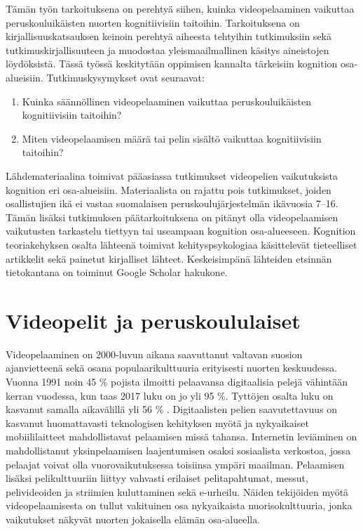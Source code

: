 \documentclass[utf8,bachelor]{gradu3}
\begin{document}
Tämän työn tarkoituksena on perehtyä siihen, kuinka videopelaaminen vaikuttaa peruskouluikäisten nuorten kognitiivisiin taitoihin. Tarkoituksena on kirjallisuuskatsauksen keinoin perehtyä aiheesta tehtyihin tutkimuksiin sekä tutkimuskirjallisuuteen ja muodostaa yleismaailmallinen käsitys aineistojen löydöksistä. Tässä työssä keskitytään oppimisen kannalta tärkeisiin kognition osa-alueisiin. Tutkimuskysymykset ovat seuraavat: 
\newpage
\begin{enumerate}
\item Kuinka säännöllinen videopelaaminen vaikuttaa peruskouluikäisten kognitiivisiin taitoihin? 
\item Miten videopelaamisen määrä tai pelin sisältö vaikuttaa kognitiivisiin taitoihin? 
\end{enumerate}

Lähdemateriaalina toimivat pääasiassa tutkimukset videopelien vaikutuksista kognition eri osa-alueisiin. Materiaalista on rajattu pois tutkimukset, joiden osallistujien ikä ei vastaa suomalaisen peruskoulujärjestelmän ikävuosia 7–16. Tämän lisäksi tutkimuksen päätarkoituksena on pitänyt olla videopelaamisen vaikutusten tarkastelu tiettyyn tai useampaan kognition osa-alueeseen. Kognition teoriakehyksen osalta lähteenä toimivat kehityspsykologiaa käsittelevät tieteelliset artikkelit sekä painetut kirjalliset lähteet.  Keskeisimpänä lähteiden etsinnän tietokantana on toiminut Google Scholar hakukone.  

\chapter{Videopelit ja peruskoululaiset}
Videopelaaminen on 2000-luvun aikana saavuttanut valtavan suosion ajanvietteenä sekä osana populaarikulttuuria erityisesti nuorten keskuudessa. Vuonna 1991 noin 45 \% pojista ilmoitti pelaavansa digitaalisia pelejä vähintään kerran vuodessa, kun taas 2017 luku on jo yli 95 \%. Tyttöjen osalta luku on kasvanut samalla aikavälillä yli 56 \%  \parencite{tilk2017}. Digitaalisten pelien saavutettavuus on kasvanut huomattavasti teknologisen kehityksen myötä ja nykyaikaiset mobiililaitteet mahdollistavat pelaamisen missä tahansa. Internetin leviäminen on mahdollistanut yksinpelaamisen laajentumisen osaksi sosiaalista verkostoa, jossa pelaajat voivat olla vuorovaikutuksessa toisiinsa ympäri maailman. Pelaamisen lisäksi pelikulttuuriin liittyy vahvasti erilaiset pelitapahtumat, messut, pelivideoiden ja striimien kuluttaminen sekä e-urheilu. Näiden tekijöiden myötä videopelaamisesta on tullut vakituinen osa nykyaikaista nuorisokulttuuria, jonka vaikutukset näkyvät nuorten jokaisella elämän osa-alueella.  
\end{document}
